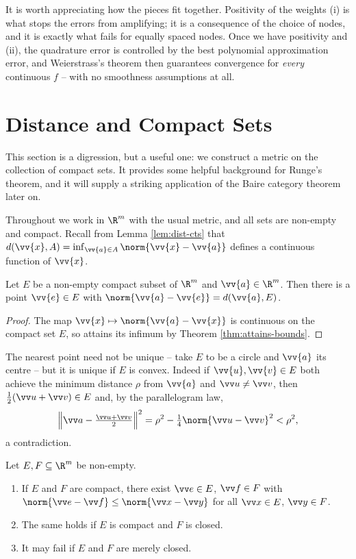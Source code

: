 It is worth appreciating how the pieces fit together. Positivity of the weights (i) is what stops the errors from amplifying; it is a consequence of the choice of nodes, and it is exactly what fails for equally spaced nodes. Once we have positivity and (ii), the quadrature error is controlled by the best polynomial approximation error, and Weierstrass's theorem then guarantees convergence for \emph{every} continuous $f$ -- with no smoothness assumptions at all.

\section{Distance and Compact Sets}

This section is a digression, but a useful one: we construct a metric on the collection of compact sets. It provides some helpful background for Runge's theorem, and it will supply a striking application of the Baire category theorem later on.

Throughout we work in $\R^m$ with the usual metric, and all sets are non-empty and compact. Recall from Lemma \ref{lem:dist-cts} that $d(\vv{x},A) = \inf_{\vv{a}\in A}\norm{\vv{x}-\vv{a}}$ defines a continuous function of $\vv{x}$.

\begin{lemma}\label{lem:nearest-point}
	Let $E$ be a non-empty compact subset of $\R^m$ and $\vv{a}\in\R^m$. Then there is a point $\vv{e}\in E$ with $\norm{\vv{a}-\vv{e}} = d(\vv{a},E)$.
\end{lemma}

\begin{proof}
	The map $\vv{x}\mapsto \norm{\vv{a}-\vv{x}}$ is continuous on the compact set $E$, so attains its infimum by Theorem \ref{thm:attains-bounds}.
\end{proof}

The nearest point need not be unique -- take $E$ to be a circle and $\vv{a}$ its centre -- but it is unique if $E$ is convex. Indeed if $\vv{u},\vv{v}\in E$ both achieve the minimum distance $\rho$ from $\vv{a}$ and $\vv u\neq\vv v$, then $\tfrac12(\vv u+\vv v) \in E$ and, by the parallelogram law,
$$\Big\lVert\vv a - \tfrac{\vv u + \vv v}{2}\Big\rVert^2 = \rho^2 - \tfrac14\norm{\vv u - \vv v}^2 < \rho^2,$$
a contradiction.

\begin{lemma}\label{lem:two-sets-min}
	Let $E,F\subseteq\R^m$ be non-empty.
	\begin{enumerate}[label=(\roman*)]
		\item If $E$ and $F$ are compact, there exist $\vv e\in E$, $\vv f\in F$ with $\norm{\vv e-\vv f}\leq\norm{\vv x - \vv y}$ for all $\vv x\in E$, $\vv y\in F$.
		\item The same holds if $E$ is compact and $F$ is closed.
		\item It may fail if $E$ and $F$ are merely closed.
	\end{enumerate}
\end{lemma}

